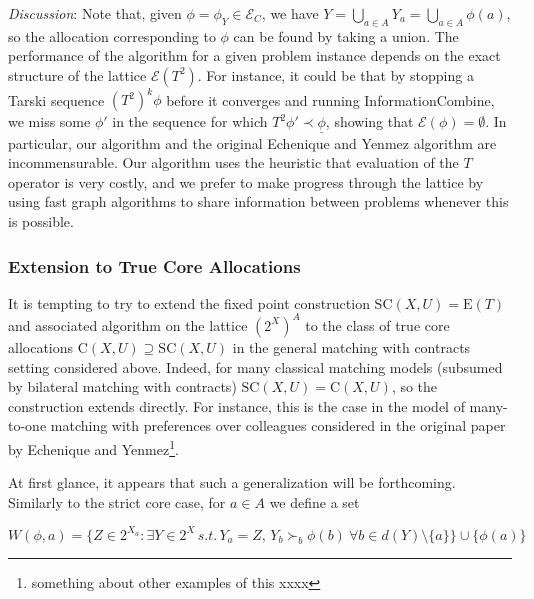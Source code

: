 \documentclass[11pt,reqno]{amsart}
\theoremstyle{definition}
\numberwithin{equation}{section}
\newcommand{\ul}{\underline}
\newcommand{\pre}{\phi}
\newcommand{\prealloc}{(2^X)^A}
\newcommand{\strcore}{\mathrm{SC}(X,U)}
\newcommand{\core}{\mathrm{C}(X,U)}
\newcommand{\fecon}{\mathrm{E}}
\newcommand{\fix}{\mathcal{E}}
\newcommand{\su}{\succ}
\newcommand{\pe}{\prec}
\newcommand{\bopre}{\ul{\pre}}
\newcommand{\fixfind}{\mathcal{E}_C}
\begin{document}
\emph{Discussion}: Note that, given $\pre = \pre_Y \in \fixfind$, we have $Y = \bigcup_{a \in A} Y_a = \bigcup_{a \in A} \pre(a)$, so the allocation corresponding to $\pre$ can be found by taking a union.
The performance of the algorithm for a given problem instance depends on the exact structure of the lattice $\fix(T^2)$.
For instance, it could be that by stopping a Tarski sequence $(T^2)^k \pre$ before it converges and running InformationCombine, we miss some $\pre'$ in the sequence for which $T^2 \pre' \pe \bopre$, showing that $\fix(\pre) = \emptyset$. 
In particular, our algorithm and the original Echenique and Yenmez algorithm are incommensurable. 
Our algorithm uses the heuristic that evaluation of the $T$ operator is very costly, and we prefer to make progress through the lattice by using fast graph algorithms to share information between problems whenever this is possible. 

\subsubsection{Extension to True Core Allocations} It is tempting to try to extend the fixed point construction $\strcore = \fecon(T)$ and associated algorithm on the lattice $\prealloc$ to the class of true core allocations $\core \supseteq \strcore$ in the general matching with contracts setting considered above. 
Indeed, for many classical matching models (subsumed by bilateral matching with contracts) $\strcore = \core$, so the construction extends directly.
For instance, this is the case in the model of many-to-one matching with preferences over colleagues considered in the original paper by Echenique and Yenmez\footnote{something about other examples of this xxxx}.

At first glance, it appears that such a generalization will be forthcoming. 
Similarly to the strict core case, for $a \in A$ we define a set 

\[
W(\pre, a) = \{Z \in 2^{X_a}: \exists Y \in 2^X \, s.t. \,  Y_a = Z, \, Y_b \su_b \pre(b) \: \forall b \in d(Y)\setminus\{a\} \} \cup \{\pre(a)\}
\]
\end{document}
